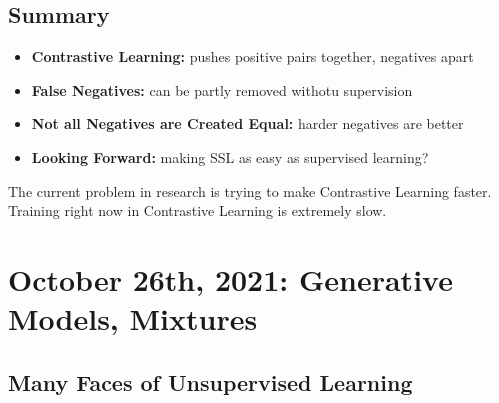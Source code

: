 \documentclass[11pt]{scrartcl}
\begin{document}
\subsection{Summary}
\begin{itemize}
    \item \textbf{Contrastive Learning:} pushes positive pairs together, negatives apart
    \item \textbf{False Negatives:} can be partly removed withotu supervision
    \item \textbf{Not all Negatives are Created Equal:} harder negatives are better
    \item \textbf{Looking Forward:} making SSL as easy as supervised learning?
\end{itemize}
The current problem in research is trying to make Contrastive Learning faster. Training right now in Contrastive Learning is extremely slow.

\newpage

\section{October 26th, 2021: Generative Models, Mixtures}

\subsection{Many Faces of Unsupervised Learning}
\end{document}
